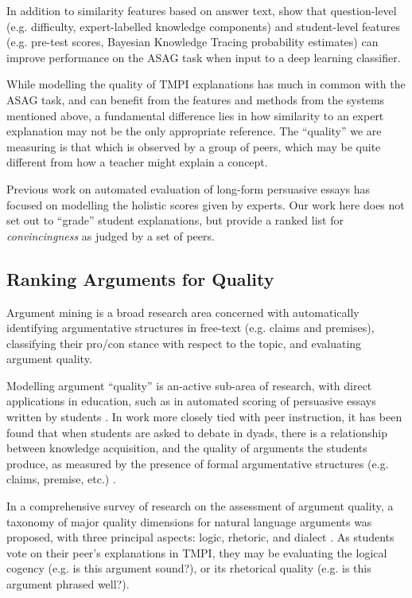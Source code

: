 \documentclass[notitlepage,12pt]{jedm}
\begin{document}
In addition to similarity features based on answer text, 
 show that question-level (e.g. difficulty, 
expert-labelled knowledge components) and student-level features (e.g. pre-test 
scores, Bayesian Knowledge Tracing probability estimates) can improve 
performance on the ASAG task when input to a deep learning classifier.

While modelling the quality of TMPI explanations has much in common with the 
ASAG task, and can benefit from the features and methods from the systems 
mentioned above, a fundamental difference lies in how similarity to an expert 
explanation may not be the only appropriate reference.
The ``quality'' we are measuring is that which is observed by a group of peers, 
which may be quite different from how a teacher might explain a concept.

Previous work on automated evaluation of long-form persuasive essays 
\cite{ghosh_coarse-grained_2016,klebanov_argumentation_2016,nguyen_argument_2018}
has focused on modelling the holistic scores given by experts.
Our work here does not set out to ``grade'' student explanations, but provide a 
ranked list for \textit{convincingness} as judged by a set of peers.


\subsection{Ranking Arguments for Quality}\label{sec:related_work:arg_quality}

Argument mining is a broad research area concerned with automatically 
identifying argumentative structures in free-text (e.g. claims and premises), 
classifying their pro/con stance with respect to the topic, and evaluating 
argument quality.

Modelling argument ``quality'' is an-active sub-area of research, with direct 
applications in education, such as in automated scoring of persuasive essays 
written by students \cite{persing_modeling_2015,nguyen_argument_2018}.
In work more closely tied with peer instruction, it has been found that when 
students are asked to debate in dyads, there is a relationship between  
knowledge acquisition, and the quality of arguments the students produce, as 
measured by the presence of formal argumentative structures (e.g. claims, 
premise, etc.) \cite{garcia-mila_effect_2013}.

In a comprehensive survey of research on the assessment of argument quality, a 
taxonomy of major quality dimensions for natural language arguments was 
proposed, with three principal aspects: logic, rhetoric, and dialect 
\cite{wachsmuth_computational_2017}. 
As students vote on their peer's explanations in TMPI, they may be evaluating 
the logical cogency (e.g. is this argument sound?), or its rhetorical quality 
(e.g. is this argument phrased well?). 
\end{document}
